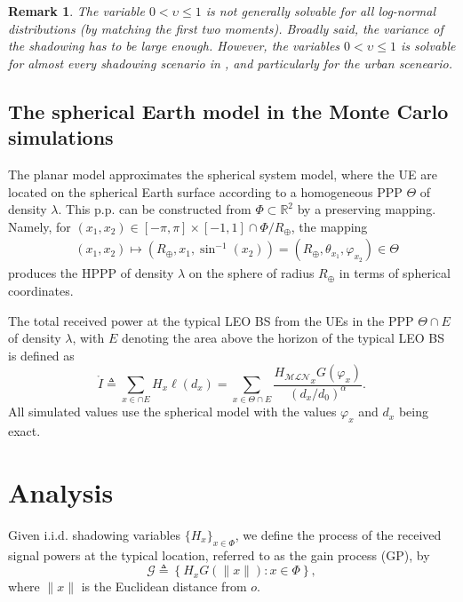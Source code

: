 \documentclass[lettersize,journal]{IEEEtran}
\newcommand{\rEarth}{R_{\oplus}}
\newcommand{\R}{\mathbb{R}}
\newtheorem*{remark}{Remark}
\begin{document}
\begin{remark}
  The variable $0 < \upsilon \leq 1$ is not generally solvable for all log-normal distributions (by matching the first two moments). Broadly said, the variance of the shadowing has to be large enough. However, the variables $0<\upsilon \leq 1$ is solvable for almost every shadowing scenario in \cite{TR38.811}, and particularly for the urban sceneario.
\end{remark}

\subsection{The spherical Earth model in the Monte Carlo simulations }

\label{sec:sphericalmodel}
The planar model approximates the spherical system model, where the UE are located on the spherical Earth surface according to a homogeneous PPP $\Theta$ of density $\lambda$. This p.p. can be constructed from $\Phi \subset \R^2$ by a preserving mapping. Namely, for $(x_1,x_2) \in [-\pi,\pi]\times[-1,1]\cap\Phi/\rEarth$, the mapping 
\begin{align}
  &(x_1,x_2)\mapsto (\rEarth,x_1,\sin^{-1}(x_2))=(\rEarth,\theta_{x_1},\varphi_{x_2}) \in \Theta
\end{align}
 produces the HPPP of density $\lambda$ on the sphere of radius $\rEarth$ in terms of spherical coordinates.

The total received power at the typical LEO BS from the UEs in the PPP $\Theta \cap E $ of density $\lambda$, with $E$ denoting the area above the horizon of the typical LEO BS is defined as
\begin{equation}
  \label{eq:mathringptot}
  \mathring{I} \triangleq  \sum_{x \in \cap E } H_x\ell(d_x) = \sum_{x \in \Theta \cap E }  \frac{{H_{\mathcal{M}\mathcal{L}\mathcal{N}}}_x G(\varphi_x)}{(d_x/d_0)^{\alpha}}.
\end{equation}
All simulated values use the spherical model with the values $\varphi_x$ and $d_x$ being exact.

\section{Analysis}

         
Given i.i.d. shadowing variables $\{H_x\}_{x \in \Phi}$, we define the process of the received signal powers at the typical location, referred to as the gain process (GP), by
\begin{equation}
  \label{eq:gainprocess}
  \mathcal{G} \triangleq \left\{ H_x G(\|x\|) : x \in \Phi \right\},
\end{equation}
where $\|x\|$ is the Euclidean distance from $\textit{o}$. 
\end{document}
